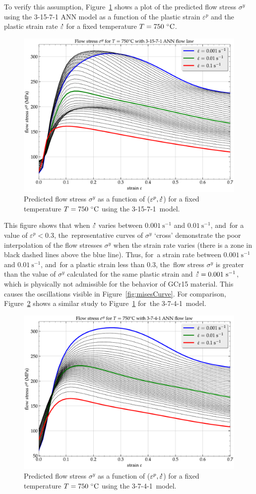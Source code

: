 \documentclass[algorithms,article,accept,pdftex,oneauthors]{Definitions/mdpi}
\DeclareRobustCommand{\mdot}[1]{\accentset{\mbox{\bfseries .}}{#1}}
\DeclareRobustCommand{\ps}{\text{s}^{-1}}
\begin{document}
To verify this assumption, Figure~\ref{fig:ShapeOF1} shows a plot of the predicted flow stress $\sigma^y$ using the 3-15-7-1 ANN model as a function of the plastic strain $\varepsilon^p$ and the plastic strain rate $\mdot\varepsilon$ for a fixed temperature $T=750~\celsius$.
\begin{figure}[H]
\includegraphics[width=0.72\columnwidth]{Figures/Shape-3-15-7-1}
\caption{Predicted flow stress $\sigma^y$ as a function of ($\varepsilon^p, \mdot\varepsilon$) for a fixed temperature $T=750~\celsius$ using the 3-15-7-1~model.}
\label{fig:ShapeOF1}
\end{figure}
This figure shows that when $\mdot\varepsilon$ varies between $0.001~\ps$ and $0.01~\ps$, and~for a value of $\varepsilon^p<0.3$, the~representative curves of $\sigma^y$ ‘cross’ demonstrate the poor interpolation of the flow stresses $\sigma^y$ when the strain rate varies (there is a zone in black dashed lines above the blue line).
Thus, for~a strain rate between $0.001~\ps$ and $0.01~\ps$, and~for a plastic strain less than $0.3$, the~flow stress $\sigma^y$ is greater than the value of $\sigma^y$ calculated for the same plastic strain and $\mdot\varepsilon=0.001~\ps$, which is physically not admissible for the behavior of GCr15 material.
This causes the oscillations visible in Figure~\ref{fig:misesCurve}.
For comparison, Figure~\ref{fig:ShapeOF2} shows a similar study to Figure~\ref{fig:ShapeOF1} for~the 3-7-4-1~model.
\begin{figure}[H]
\includegraphics[width=0.75\columnwidth]{Figures/Shape-3-7-4-1}
\caption{Predicted flow stress $\sigma^y$ as a function of ($\varepsilon^p, \mdot\varepsilon$) for a fixed temperature $T=750~\celsius$ using the 3-7-4-1~model.}
\label{fig:ShapeOF2}
\end{figure}
\end{document}
